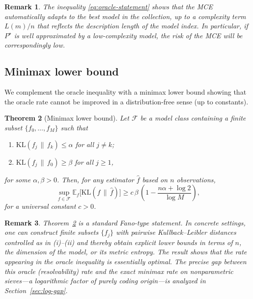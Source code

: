 \documentclass[12pt]{article}
\newtheorem{theorem}{Theorem}[section]
\newtheorem{remark}[theorem]{Remark}
\numberwithin{equation}{section}
\begin{document}
	\begin{remark}
		The inequality \eqref{eq:oracle-statement} shows that the MCE
		automatically adapts to the best model in the collection, up to a
		complexity term $L(m)/n$ that reflects the description length of the
		model index. In particular, if $P^{\star}$ is well approximated by a
		low-complexity model, the risk of the MCE will be correspondingly low.
	\end{remark}
	
	\subsection{Minimax lower bound}
	
	We complement the oracle inequality with a minimax lower bound showing
	that the oracle rate cannot be improved in a distribution-free sense
	(up to constants).
	
	\begin{theorem}[Minimax lower bound]
		\label{thm:minimax-lower}
		Let $\mathcal{F}$ be a model class containing a finite subset
		$\{f_0,\ldots,f_M\}$ such that
		\begin{enumerate}
			\item $\mathrm{KL}(f_j\,\|\,f_k) \le \alpha$ for all $j\ne k$;
			\item $\mathrm{KL}(f_j\,\|\,f_0) \ge \beta$ for all $j\ge 1$,
		\end{enumerate}
		for some $\alpha,\beta>0$. Then, for any estimator $\widehat{f}$ based
		on $n$ observations,
		\begin{equation}
			\label{eq:minimax-statement}
			\sup_{f\in\mathcal{F}}
			\mathbb{E}_f\big[\mathrm{KL}(f\,\|\,\widehat{f})\big]
			\ge c\,\beta\,
			\left(1 - \frac{n\alpha + \log 2}{\log M}\right),
		\end{equation}
		for a universal constant $c>0$.
	\end{theorem}
	
	\begin{remark}
		Theorem~\ref{thm:minimax-lower} is a standard Fano-type statement. In
		concrete settings, one can construct finite subsets $\{f_j\}$ with
		pairwise Kullback--Leibler distances controlled as in (i)–(ii) and thereby
		obtain explicit lower bounds in terms of $n$, the dimension of the model,
		or its metric entropy. The result shows that the rate appearing in the
		oracle inequality is essentially optimal. The precise gap between this
		oracle (resolvability) rate and the \emph{exact} minimax rate on
		nonparametric sieves---a logarithmic factor of purely coding origin---is
		analyzed in Section~\ref{sec:log-gap}.
	\end{remark}
\end{document}
